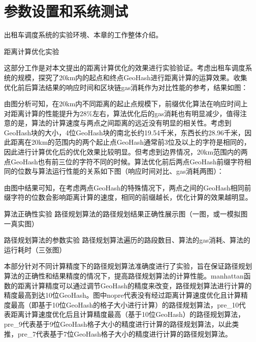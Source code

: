 \chapter{参数设置和系统测试}
出租车调度系统的实验环境、本章的工作整体介绍。


距离计算优化实验

这部分工作是对本文提出的距离计算优化的效果进行实验验证。考虑出租车调度系统的规模，探究了20km内的起点和终点GeoHash进行距离计算的运算效果。收集优化前后算法结果的响应时间和区块链gas消耗作为对比性能的参考，结果如图：


由图分析可知，在20km内不同距离的起止点规模下，前缀优化算法在响应时间上对距离计算的性能提升为28$\%$左右，算法优化后的gas消耗也有明显减少，值得注意的是，算法的计算速度与两点之间距离的远近没有明显的相关性。考虑到GeoHash块的大小，4位GeoHash块的南北长约19.54千米，东西长约28.96千米，因此距离在20km的范围内的两个起止点GeoHash通常前3位及以上的字符是相同的，因此进行计算优化后的优化效果比较明显。但考虑到边界情况，20km范围内的两点GeoHash也有前三位的字符不同的时候。算法优化前后两点GeoHash前缀字符相同的位数与算法运行性能的关系如下图（响应时间对比、gas消耗两图）：


由图中结果可知，在考虑两点GeoHash的特殊情况下，两点之间的GeoHash相同前缀字符的位数会影响距离计算的速度，相同的前缀越长，优化计算的效果越明显。



算法正确性实验
  路径规划算法的路径规划结果正确性展示图（一图，或一模拟图一真实图）



路径规划算法的参数实验
  路径规划算法遍历的路段数目、算法的gas消耗、算法的运行耗时（三张图）

  本部分针对不同计算精度下的路径规划算法准确度进行了实验，旨在保证路径规划算法的正确性和结果精度的情况下，提高路径规划算法的计算性能。manhattan函数的距离计算精度可以通过调节GeoHash的精度来改变，路径规划算法进行计算的精度最高到达10位GeoHash。图中nopre代表没有经过距离计算速度优化且计算精度最高（即基于10位GeoHash的格子大小进行计算）的路径规划算法，pre_10代表距离计算速度优化后且计算精度最高（基于10位GeoHash）的路径规划算法，pre_9代表基于9位GeoHash格子大小的精度进行计算的路径规划算法，以此类推，pre_7代表基于7位GeoHash格子大小的精度进行计算的路径规划算法。

